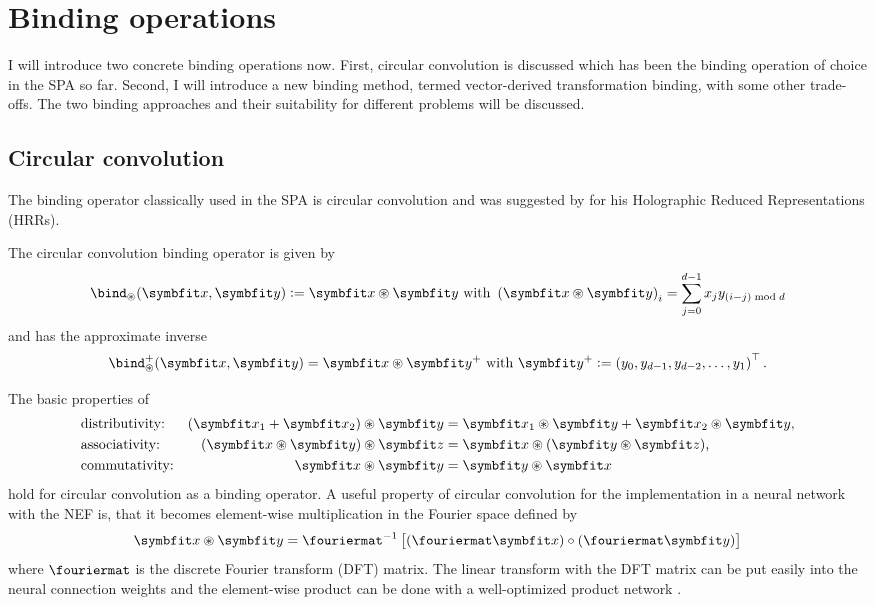 \section{Binding operations}
I will introduce two concrete binding operations now.
First, circular convolution is discussed which has been the binding operation of choice in the SPA so far.
Second, I will introduce a new binding method, termed vector-derived transformation binding, with some other trade-offs.
The two binding approaches and their suitability for different problems will be discussed.

\subsection{Circular convolution}
The binding operator classically used in the SPA is circular convolution and was suggested by \textcite{plate1995,plate2003} for his Holographic Reduced Representations (HRRs).
\begin{defn}
    The circular convolution binding operator is given by
    \begin{equation}
        \bind_{\circledast}(\vc x, \vc y) := \vc x \circledast \vc y\ \text{with}\ \del{\vc x \circledast \vc y}_i = \sum_{j=0}^{d - 1} x_j y_{(i - j) \bmod d}
    \end{equation}
    and has the approximate inverse \parencite{plate2003}
    \begin{equation}
        \bind^+_{\circledast}(\vc x, \vc y) = \vc x \circledast \vc y^+\ \text{with}\ \vc y^+ := \del{y_0, y_{d-1}, y_{d-2}, \dotsc, y_1}\Tr \text{.}
    \end{equation}
\end{defn}

The basic properties of
\begin{align}
    &\text{distributivity:} &(\vc x_1 + \vc x_2) \circledast \vc y &= \vc x_1 \circledast \vc y + \vc x_2 \circledast \vc y \text{,}\\
    &\text{associativity:} &(\vc x \circledast \vc y) \circledast \vc z &= \vc x \circledast (\vc y \circledast \vc z) \text{,} \\
    &\text{commutativity:} &\vc x \circledast \vc y &= \vc y \circledast \vc x
\end{align}
hold for circular convolution as a binding operator.
A useful property of circular convolution for the implementation in a neural network with the NEF is, that it becomes element-wise multiplication in the Fourier space defined by
\begin{equation}
    \vc x \circledast \vc y = \fouriermat^{-1}\sbr{(\fouriermat \vc x) \circ (\fouriermat \vc y)}
\end{equation}
where $\fouriermat$ is the discrete Fourier transform (DFT) matrix.
The linear transform with the DFT matrix can be put easily into the neural connection weights and the element-wise product can be done with a well-optimized product network \parencite{gosmann2015-1}.

